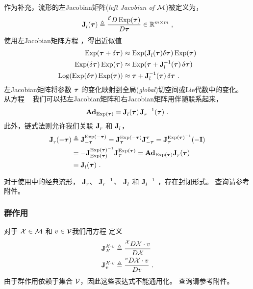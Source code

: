 作为补充，流形的左Jacobian矩阵(\emph{left Jacobian of $\cM$})被定义为， 
%
\begin{align}
\mjac{}{l}(\bftau) \te \ldpar{\Exp(\bftau)}{\bftau} \in \bbR^{m\times m} 
~,
\label{equ:M_Jl}
\end{align}
%
使用左Jacobian矩阵方程 ，得出近似值
%
\begin{align}
\Exp(\bftau+\delta\bftau) &\approx \Exp(\mjac{}{l}(\bftau)\delta\bftau)\Exp(\bftau)  \label{equ:Jl_1}\\
\Exp(\delta\bftau)\Exp(\bftau) &\approx \Exp(\bftau+\mjac{-1}{l}(\bftau)\,\delta\bftau)  \label{equ:Jl_2}\\
\Log(\Exp(\delta\bftau)\Exp(\bftau)) &\approx \bftau+\mjac{-1}{l}(\bftau)\,\delta\bftau  \label{equ:Jl_3}
~.
\end{align}
% 
左Jacobian矩阵将参数 $\bftau$ 的变化映射到全局(\emph{global})切空间或Lie代数中的变化。
从方程 ~ 我们可以把左Jacobian矩阵和右Jacobian矩阵用伴随联系起来，
%
\begin{align}\label{equ:Jr_Jl_Adj}
\Ad[\cM]{\Exp(\bftau)} = \mjac{}{l}(\bftau)\,\mjac{}{r}\inv(\bftau)
~.
\end{align}
%
此外，链式法则允许我们关联 $\mjac{}{r}$ 和 $\mjac{}{l}$，
%
\begin{align}\label{equ:Jr_minus}
\mjac{}{r}(-\bftau) 
  &\te \mjac{\Exp(-\bftau)}{-\bftau} 
  = \mjac{\Exp(-\bftau)}{\bftau}\mjac{\bftau}{-\bftau} 
  = \mjac{\Exp(\bftau)\inv}{\bftau}(-\bfI) 
  \notag\\
  &
  = -\mjac{\Exp(\bftau)\inv}{\Exp(\bftau)}\mjac{\Exp(\bftau)}{\bftau} 
  = \Ad{\Exp(\bftau)}\mjac{}{r}(\bftau)
  \notag\\
  &
  = \mjac{}{l}(\bftau)
  ~.
\end{align}



对于使用中的经典流形， $\mjac{}{r}$、 $\mjac{}{r}\inv$、 $\mjac{}{l}$ 和 $\mjac{}{l}\inv$ ，存在封闭形式。
查询请参考附件。


\subsubsection{群作用}


对于 $\cX\in\cM$ 和 $v\in\cV$我们用方程  定义
%
\begin{align}
\mjac{\cX\cdot v}{\cX} &\te \rdpar{\cX\cdot v}{\cX} \\
\mjac{\cX\cdot v}{v}   &\te \rdpar{\cX\cdot v}{v} 
~.
\end{align}
%
由于群作用依赖于集合 $\cV$，因此这些表达式不能通用化。
查询请参考附件。



